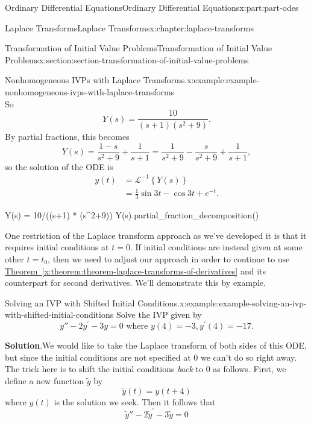 \documentclass[twoside,10pt,]{book}
\newcommand{\blocktitlefont}{\relax}
\newcommand{\xreffont}{\relax}
\numberwithin{equation}{part}
\newcommand{\iLaplace}[1]{\mathcal{L}^{-1}\left\{#1\right\}}
\newcommand{\amp}{&}
\begin{document}
\begin{partptx}{Ordinary Differential Equations}{}{Ordinary Differential Equations}{}{}{x:part:part-odes}
\begin{chapterptx}{Laplace Transforms}{}{Laplace Transforms}{}{}{x:chapter:laplace-transforms}
\begin{sectionptx}{Transformation of Initial Value Problems}{}{Transformation of Initial Value Problems}{}{}{x:section:section-transformation-of-initial-value-problems}
\begin{example}{Nonhomogeneous IVPs with Laplace Transforms.}{x:example:example-nonhomogeneous-ivps-with-laplace-transforms}
\begin{equation*}
\end{equation*}
So%
\begin{equation*}
Y(s) = \frac{10}{(s+1)(s^{2}+9)}.
\end{equation*}
By partial fractions, this becomes%
\begin{equation*}
Y(s) = \frac{1-s}{s^{2}+9} + \frac{1}{s+1} = \frac{1}{s^{2}+9} - \frac{s}{s^{2}+9} + \frac{1}{s+1},
\end{equation*}
so the solution of the ODE is%
\begin{align*}
y(t) \amp = \iLaplace{Y(s)}\\
\amp= \frac{1}{3}\sin3t -\cos3t + e^{-t}\text{.}
\end{align*}
%
\end{example}
\begin{sageinput}
Y(s) = 10/((s+1) * (s^2+9))
Y(s).partial_fraction_decomposition()
\end{sageinput}
One restriction of the Laplace transform approach as we've developed it is that it requires initial conditions at \(t=0\). If initial conditions are instead given at some other \(t=t_0\), then we need to adjust our approach in order to continue to use \hyperref[x:theorem:theorem-laplace-transforms-of-derivatives]{Theorem~{\xreffont\ref{x:theorem:theorem-laplace-transforms-of-derivatives}}} and its counterpart for second derivatives. We'll demonstrate this by example.%
\begin{example}{Solving an IVP with Shifted Initial Conditions.}{x:example:example-solving-an-ivp-with-shifted-initial-conditions}%
Solve the IVP given by%
\begin{equation*}
y'' - 2y^\prime - 3y = 0\text{ where }y(4) = -3, y^\prime(4) = -17.
\end{equation*}
%
\par\smallskip%
\noindent\textbf{\blocktitlefont Solution}.\hypertarget{g:solution:idp105548816524704}{}\quad{}We would like to take the Laplace transform of both sides of this ODE, but since the initial conditions are not specified at \(0\) we can't do so right away. The trick here is to shift the initial conditions \emph{back} to \(0\) as follows. First, we define a new function \(\widetilde{y}\) by%
\begin{equation*}
\widetilde{y}(t) = y(t+4)
\end{equation*}
where \(y(t)\) is the solution we seek. Then it follows that%
\begin{equation*}
\widetilde{y}'' - 2\widetilde{y}^\prime - 3\widetilde{y} = 0
\end{equation*}

\end{example}
\end{sectionptx}
\end{chapterptx}
\end{partptx}
\end{document}
